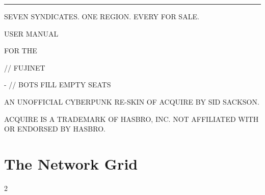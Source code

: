 \documentclass[12pt,letterpaper]{article}
\begin{document}
\begin{titlepage}
\machine
\vspace*{1.6in}
{\color{amber}\rule{\linewidth}{2pt}}\par\vspace{14pt}
{\fontsize{44}{48}\selectfont \game\par}\vspace{10pt}
{\fontsize{12}{16}\selectfont\color{steel} SEVEN SYNDICATES. ONE REGION. EVERY \MakeUppercase{} FOR SALE.\par}
\vspace{14pt}{\color{amber}\rule{\linewidth}{2pt}}\par
\vspace{0.35in}
{\fontsize{24}{30}\selectfont USER MANUAL\par}\vspace{4pt}
{\fontsize{14}{18}\selectfont\color{amber} FOR THE \MakeUppercase{\PlatformLong}\par}
\vspace{0.4in}
{\fontsize{12}{16}\selectfont \PlatformMachines \quad // \quad FUJINET\par
{}- \MakeUppercase{} \quad // \quad BOTS FILL EMPTY SEATS\par}
\vfill
{\fontsize{8.5}{11}\selectfont\color{steel}
AN UNOFFICIAL CYBERPUNK RE-SKIN OF ACQUIRE BY SID SACKSON.\par
ACQUIRE IS A TRADEMARK OF HASBRO, INC. NOT AFFILIATED WITH OR ENDORSED BY HASBRO.\par}
\end{titlepage}

\renewcommand{\secstatus}{THE SETTING \quad // \quad THE OBJECT \quad // \quad THE END}
\chapter{The Network Grid}
\begin{multicols}{2}
\end{multicols}

\renewcommand{\secstatus}{THE DISK \quad // \quad THE DRIVER \quad // \quad HANDLE}
\end{document}
